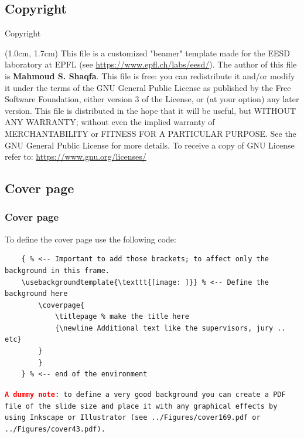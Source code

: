 \documentclass{EESD}
\begin{document}
\subsection{Copyright}
\begin{frame}[t]{Copyright}
\begin{textblock*}{13cm}(1.0cm,  1.7cm)
    {\selectfont
    This file is a customized "beamer" template made for the EESD laboratory at EPFL (see \href{https://www.epfl.ch/labs/eesd/}{https://www.epfl.ch/labs/eesd/}). The author of this file is \textbf{Mahmoud S. Shaqfa}. This file is free: you can redistribute it and/or modify it under the terms of the GNU General Public License as published by    the Free Software Foundation, either version 3 of the License, or (at your option) any later version. This file is distributed in the hope that it will be useful, but WITHOUT ANY WARRANTY; without even the implied warranty of MERCHANTABILITY or FITNESS FOR A PARTICULAR PURPOSE.  See the GNU General Public License for more details. To receive a copy of GNU License refer to: \href{https://www.gnu.org/licenses/}{https://www.gnu.org/licenses/}
    }
\end{textblock*}
\end{frame}

\subsection{Cover page}
\begin{frame}[fragile]
\frametitle{Cover page}
    To define the cover page use the following code:
    \vspace{10pt}
    \begin{lstlisting}
    { % <-- Important to add those brackets; to affect only the background in this frame.
    \usebackgroundtemplate{\texttt{[image: ]}} % <-- Define the background here
        \coverpage{
            \titlepage % make the title here
            {\newline Additional text like the supervisors, jury .. etc}
        }
        }
    } % <-- end of the environment
    \end{lstlisting}
    \texttt{\small{\textcolor{red}{\textbf{A dummy note}}: to define a very good background you can create a PDF file of the slide size and place it with any graphical effects by using Inkscape or Illustrator (see ../Figures/cover169.pdf or ../Figures/cover43.pdf).}}
    \vspace{10pt}
\end{frame}
\end{document}

